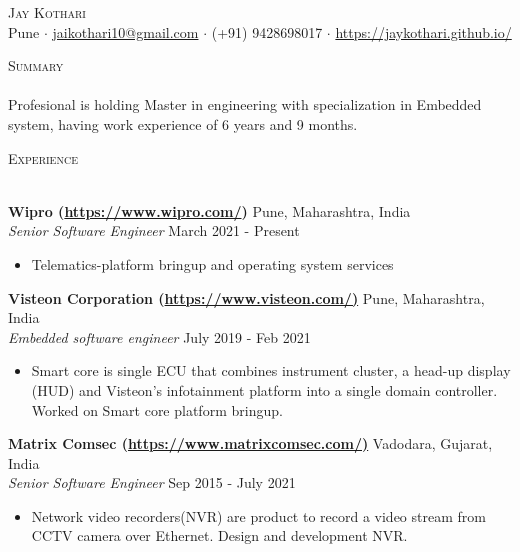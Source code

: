 \documentclass[a4paper]{article}
\newcommand{\lineunder} {
    \vspace*{-8pt} \\
    \hspace*{-18pt} \hrulefill \\
}
\newcommand{\header} [1] {
    {\hspace*{-18pt}\vspace*{6pt} \textsc{#1}}
    \vspace*{-6pt} \lineunder
}
\begin{document}
\vspace*{-40pt}

    

\vspace*{-10pt}
\begin{center}
	{\Huge \scshape {Jay Kothari}}\\
	Pune $\cdot$ \url{jaikothari10@gmail.com} $\cdot$ (+91) 9428698017 $\cdot$ \url{https://jaykothari.github.io/}\\
\end{center}

\header{Summary}
\vspace{1mm}
Profesional is holding Master in engineering with specialization in Embedded system, having work experience of 6 years and 9 months.

\header{Experience}
\vspace{1mm}

\textbf{Wipro (\url{https://www.wipro.com/})} \hfill Pune, Maharashtra, India\\
\textit{Senior Software Engineer} \hfill March 2021 - Present\\
\vspace{-1mm}
\begin{itemize} \itemsep 1pt
	\item Telematics-platform bringup and operating system services
\end{itemize}

\textbf{Visteon Corporation (\url{https://www.visteon.com/)}} \hfill Pune, Maharashtra, India\\
\textit{Embedded software engineer} \hfill July 2019 - Feb 2021\\
\vspace{-1mm}
\begin{itemize} \itemsep 1pt
	\item Smart core is single ECU that combines instrument cluster, a head-up display (HUD) and Visteon’s infotainment platform into a single domain controller. Worked on Smart core platform bringup. 
\end{itemize}

\textbf{Matrix Comsec (\url{https://www.matrixcomsec.com/)}} \hfill Vadodara, Gujarat, India\\
\textit{Senior Software Engineer} \hfill Sep 2015 - July 2021\\
\vspace{-1mm}
\begin{itemize} \itemsep 1pt
	\item Network video recorders(NVR) are product to record a video stream from CCTV camera over Ethernet. Design and development NVR.
\end{itemize}
\end{document}
